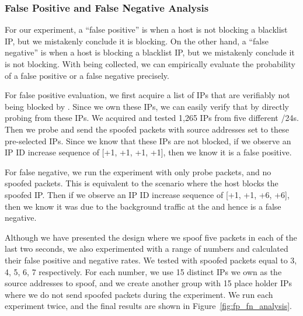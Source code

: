 \subsubsection{False Positive and False Negative Analysis}
\label{subsec:fpfn_analysis}
For our experiment, a ``false positive'' is when a host is not
blocking a blacklist IP, but we mistakenly conclude it is blocking. On the
other hand, a ``false negative'' is when a host is blocking a
blacklist IP, but we mistakenly conclude it is not blocking. With
{} being collected, we can empirically evaluate the
probability of a false positive or a false negative precisely.

For false positive evaluation, we first acquire a list of IPs that are verifiably
not being blocked by {}. Since we own these IPs, we can easily verify
that by directly probing {} from these IPs. We acquired and tested
1,265 IPs from five different /24s. Then we probe {} and send the
spoofed packets with source addresses set to these pre-selected IPs. Since we
know that these IPs are not blocked, if we observe an IP ID increase sequence of
[+1, +1, +1, +1], then we know it is a false positive.

For false negative, we run the experiment with only probe packets, and no
spoofed packets. This is equivalent to the scenario where the host blocks the
spoofed IP. Then if we observe an IP ID increase sequence of [+1, +1, +6,
+6], then we know it was due to the background traffic at the {}
and hence is a false negative.

Although we have presented the design where we spoof five packets
in each of the last two seconds, we also experimented with a range of
numbers and calculated their false positive and negative rates. We tested
with spoofed packets equal to 3, 4, 5, 6, 7 respectively. For each number,
we use 15 distinct IPs we own as the source addresses to spoof, and we
create another group with 15 place holder IPs where we do not send spoofed
packets during the experiment. We run each experiment twice, and the final
results are shown in Figure~\ref{fig:fp_fn_analysis}.


